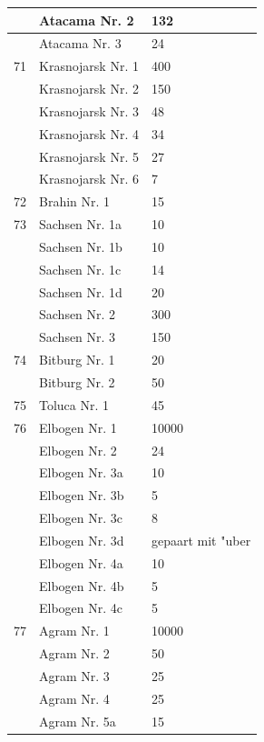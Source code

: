 \documentclass[a4paper, 11pt, oneside, polutonikogreek, german]{article}
\begin{document}
\begin{center}
\begin{longtable}{|l|l|l|}
          & Atacama Nr. 2 & 132 \\ \hline
          & Atacama Nr. 3 & 24 \\ \hline
        71 & Krasnojarsk Nr. 1 & 400 \\ \hline
          & Krasnojarsk Nr. 2 & 150 \\ \hline
          & Krasnojarsk Nr. 3 & 48 \\ \hline
          & Krasnojarsk Nr. 4 & 34 \\ \hline
          & Krasnojarsk Nr. 5 & 27 \\ \hline
          & Krasnojarsk Nr. 6 & 7 \\ \hline
        72 & Brahin Nr. 1 & 15 \\ \hline
        73 & Sachsen Nr. 1a & 10 \\ \hline
          & Sachsen Nr. 1b & 10 \\ \hline
          & Sachsen Nr. 1c & 14 \\ \hline
          & Sachsen Nr. 1d & 20 \\ \hline
          & Sachsen Nr. 2 & 300 \\ \hline
          & Sachsen Nr. 3 & 150 \\ \hline
        74 & Bitburg Nr. 1 & 20 \\ \hline
          & Bitburg Nr. 2 & 50 \\ \hline
        75 & Toluca Nr. 1 & 45 \\ \hline
        76 & Elbogen Nr. 1 & 10000 \\ \hline
          & Elbogen Nr. 2 & 24 \\ \hline
          & Elbogen Nr. 3a & 10 \\ \hline
          & Elbogen Nr. 3b & 5 \\ \hline
          & Elbogen Nr. 3c & 8 \\ \hline
          & Elbogen Nr. 3d & gepaart mit "uber \\ \hline
          & Elbogen Nr. 4a & 10 \\ \hline
          & Elbogen Nr. 4b & 5 \\ \hline
          & Elbogen Nr. 4c & 5 \\ \hline
        77 & Agram Nr. 1 & 10000 \\ \hline
          & Agram Nr. 2 & 50 \\ \hline
          & Agram Nr. 3 & 25 \\ \hline
          & Agram Nr. 4 & 25 \\ \hline
          & Agram Nr. 5a & 15 \\ \hline

\end{longtable}
\end{center}
\end{document}
